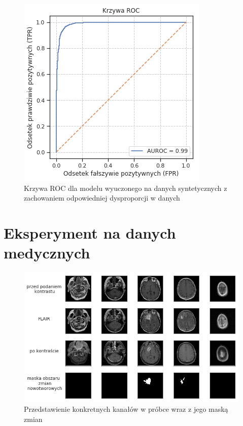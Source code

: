 \documentclass[polish, 13pt]{beamer}
\begin{document}
\begin{frame}
 \begin{figure}
  \includegraphics[scale=0.6]{images/mnist_roc_v2}
  \caption{Krzywa ROC dla modelu wyuczonego na danych syntetycznych z zachowaniem odpowiedniej dysproporcji w danych}
 \end{figure}
\end{frame}

\section{Eksperyment na danych medycznych}

\begin{frame}
 \begin{figure}
  \includegraphics[scale=0.42]{images/medical_description}
  \caption{Przedstawienie konkretnych kanałów w próbce wraz z jego maską zmian}
 \end{figure}
\end{frame}
\end{document}
